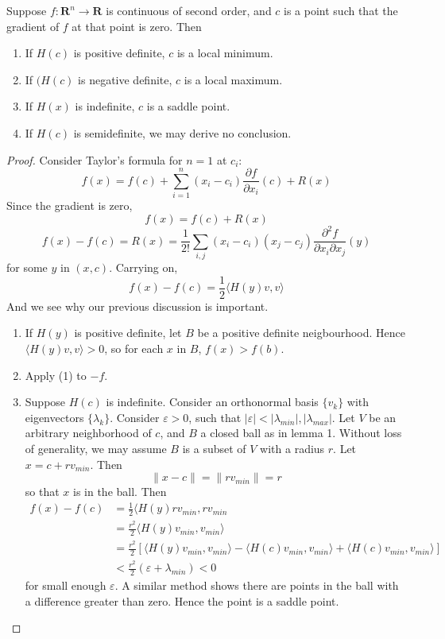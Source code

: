 \begin{theorem}
    Suppose $f:\mathbf{R}^n \to \mathbf{R}$ is continuous of second order, and $c$ is a point such that the gradient of $f$ at that point is zero. Then
    \begin{enumerate}
        \item If $H(c)$ is positive definite, $c$ is a local minimum.
        \item If $(H(c)$ is negative definite, $c$ is a local maximum.
        \item If $H(x)$ is indefinite, $c$ is a saddle point.
        \item If $H(c)$ is semidefinite, we may derive no conclusion.
    \end{enumerate}
\end{theorem}
\begin{proof}
    Consider Taylor's formula for $n = 1$ at $c_i$:
    \[ f(x) = f(c) + \sum_{i = 1}^n (x_i - c_i) \frac{\partial f}{\partial x_i}(c) + R(x) \]
    Since the gradient is zero,
    \[ f(x) = f(c) + R(x) \]
    \[ f(x) - f(c) = R(x) = \frac{1}{2!} \sum_{i,j} (x_i - c_i)(x_j - c_j) \frac{\partial^2 f}{\partial x_i \partial x_j} (y) \]
    for some $y$ in $(x,c)$. Carrying on,
    \[ f(x) - f(c) = \frac{1}{2} \langle H(y)v, v \rangle \]
    And we see why our previous discussion is important.
    \begin{enumerate}
        \item If $H(y)$ is positive definite, let $B$ be a positive definite neigbourhood. Hence $\langle H(y)v, v \rangle > 0$, so for each $x$ in $B$, $f(x) > f(b)$.
        \item Apply (1) to $-f$.
        \item Suppose $H(c)$ is indefinite. Consider an orthonormal basis $\{ v_k \}$ with eigenvectors $\{ \lambda_k \}$. Consider $\varepsilon > 0$, such that $|\varepsilon| < |\lambda_{min}|,|\lambda_{max}|$. Let $V$ be an arbitrary neighborhood of $c$, and $B$ a closed ball as in lemma 1. Without loss of generality, we may assume $B$ is a subset of $V$ with a radius $r$. Let $x = c + r v_{min}$. Then
        \[ \|x - c\| = \|r v_{min} \| = r \]
        so that $x$ is in the ball. Then
        \begin{align*}
            f(x) - f(c) &= \frac{1}{2} \langle H(y)r v_{min}, r v_{min}\\
            &= \frac{r^2}{2} \langle H(y) v_{min}, v_{min} \rangle\\
            &= \frac{r^2}{2} [\langle H(y) v_{min}, v_{min} \rangle - \langle H(c) v_{min}, v_{min} \rangle + \langle H(c) v_{min}, v_{min} \rangle]\\
            &< \frac{r^2}{2} (\varepsilon + \lambda_{min}) < 0
        \end{align*}
        for small enough $\varepsilon$. A similar method shows there are points in the ball with a difference greater than zero. Hence the point is a saddle point.
    \end{enumerate}
\end{proof}

